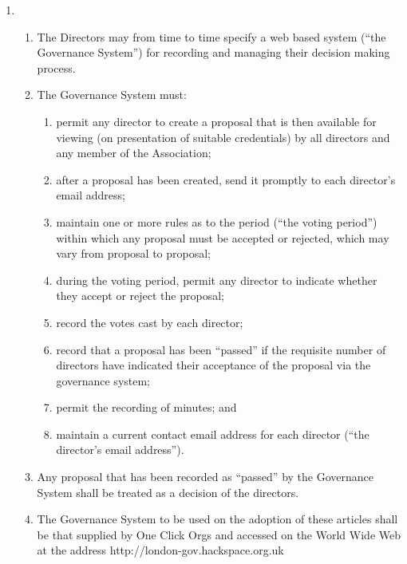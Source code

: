 \begin{enumerate}
\item
  \begin{enumerate}
    \item
    The Directors may from time to time specify a web based system (``the
    Governance System'') for recording and managing their decision making process.
    \item
    The Governance System must:
        \begin{enumerate}
            \item
             permit any director to create a proposal that is then available for viewing (on
             presentation of suitable credentials) by all directors and any member of the
             Association;
            \item
            after a proposal has been created, send it promptly to each director's email address;
            \item
             maintain one or more rules as to the period (``the voting period'') within which any
             proposal must be accepted or rejected, which may vary from proposal to proposal;
            \item
             during the voting period, permit any director to indicate whether they accept or reject
             the proposal;
            \item
             record the votes cast by each director;
            \item
             record that a proposal has been ``passed'' if the requisite number of directors have
             indicated their acceptance of the proposal via the governance system;
            \item
             permit the recording of minutes; and
            \item
             maintain a current contact email address for each director (``the director's email
             address'').
        \end{enumerate}
    \item
    Any proposal that has been recorded as ``passed'' by the Governance System shall
    be treated as a decision of the directors.
    \item
    The Governance System to be used on the adoption of these articles shall be that
    supplied by One Click Orgs and accessed on the World Wide Web at the address
    http://london-gov.hackspace.org.uk
  \end{enumerate}


\end{enumerate}
